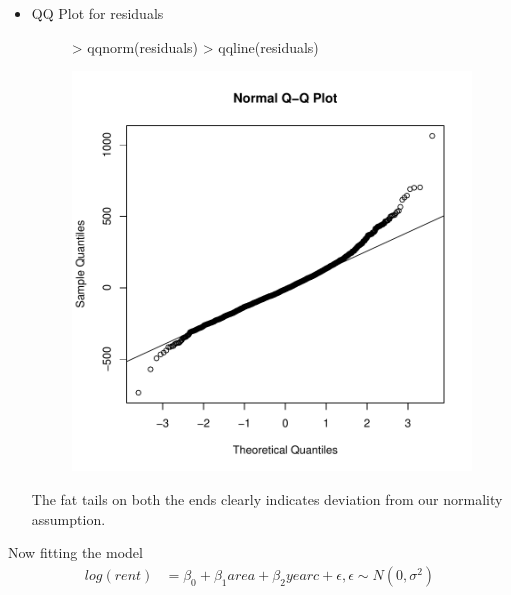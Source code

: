 \documentclass[12pt]{article}
\begin{document}
\begin{itemize}
\item QQ Plot for residuals
\begin{figure}[H]
\begin{Schunk}
\begin{Sinput}
> qqnorm(residuals)
> qqline(residuals)
\end{Sinput}
\end{Schunk}
\includegraphics{HW3-035}
\end{figure}
The fat tails on both the ends clearly indicates deviation from our normality assumption.
\end{itemize}
\item Now fitting the model 
\begin{equation*}
\begin{aligned}
log(rent) &= \beta_0 + \beta_1 area + \beta_2 yearc + \epsilon, \epsilon \sim N(0,\sigma^2)
\end{aligned}
\end{equation*}
\end{document}
